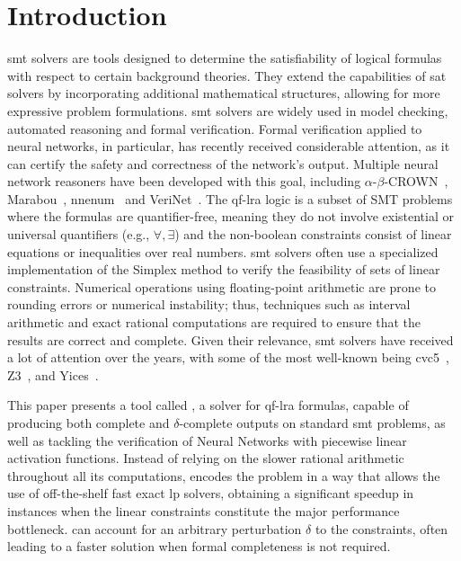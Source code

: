 \documentclass[runningheads]{llncs}
\begin{document}
\section{Introduction}

\gls{smt} solvers are tools designed to determine the satisfiability of logical formulas with respect to certain background theories.
They extend the capabilities of \gls{sat} solvers by incorporating additional mathematical structures, allowing for more expressive problem formulations.
\gls{smt} solvers are widely used in model checking, automated reasoning and formal verification.
Formal verification applied to neural networks, in particular, has recently received considerable attention, as it can certify the safety and correctness of the network's output.
Multiple neural network reasoners have been developed with this goal, including $\alpha$-$\beta$-CROWN~\cite{ref:a-crown,ref:b-crown,ref:crown,ref:lirpa}, Marabou~\cite{ref:marabou}, nnenum~\cite{ref:nnenum} and VeriNet~\cite{ref:verinet}.
The \gls{qf-lra} logic is a subset of SMT problems where the formulas are quantifier-free, meaning they do not involve existential or universal quantifiers (e.g., $\forall, \exists$) and the non-boolean constraints consist of linear equations or inequalities over real numbers.
\gls{smt} solvers often use a specialized implementation of the Simplex method to verify the feasibility of sets of linear constraints.
Numerical operations using floating-point arithmetic are prone to rounding errors or numerical instability; thus, techniques such as interval arithmetic and exact rational computations are required to ensure that the results are correct and complete.
Given their relevance, \gls{smt} solvers have received a lot of attention over the years, with some of the most well-known being cvc5~\cite{ref:cvc5}, Z3~\cite{ref:z3}, and Yices~\cite{ref:yices}.

This paper presents a tool called \dlinear, a solver for \gls{qf-lra} formulas, capable of producing both complete and $\delta$-complete outputs on standard \gls{smt} problems, as well as tackling the verification of Neural Networks with piecewise linear activation functions.
Instead of relying on the slower rational arithmetic throughout all its computations, \dlinear encodes the problem in a way that allows the use of off-the-shelf fast exact \gls{lp} solvers, obtaining a significant speedup in instances when the linear constraints constitute the major performance bottleneck.
\dlinear can account for an arbitrary perturbation $\delta$ to the constraints, often leading to a faster solution when formal completeness is not required.
\end{document}
